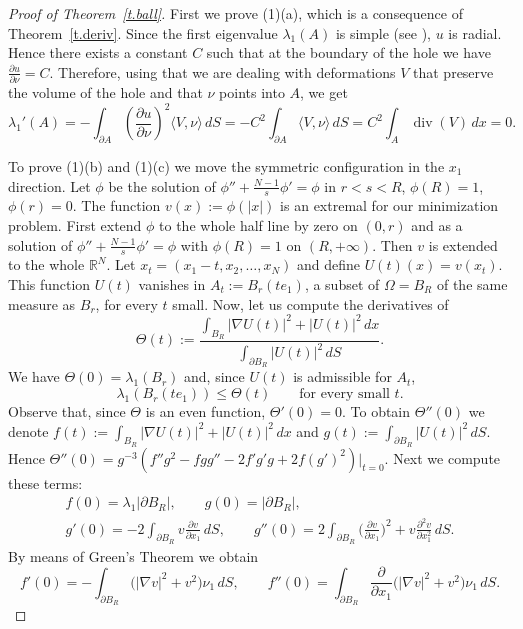 \documentclass[11pt]{amsart}
\theoremstyle{remark}
\numberwithin{equation}{section}
\newcommand{\R}{\mathbb{R}}
\DeclareMathOperator{\divg}{div}
\begin{document}
\begin{proof}[Proof of Theorem~\ref{t.ball}]
First we prove (1)(a), which is a consequence of Theorem~\ref{t.deriv}. Since the first eigenvalue $\lambda_1(A)$ is simple (see \cite{MR}), $u$ is radial. Hence there exists a constant $C$ such that at the boundary of the hole we have $\frac{\partial u}{\partial\nu}=C$. Therefore, using that we are dealing with deformations $V$ that preserve the volume of the hole and that $\nu$ points into $A$, we get
\[
\lambda_1'(A)=-\int_{\partial A}\left(\frac{\partial u}{\partial\nu}\right)^2\langle V,\nu\rangle\,dS=-C^2\int_{\partial A}\langle V,\nu\rangle\,dS=C^2\int_A\divg(V)\,dx=0.
\]

To prove (1)(b) and (1)(c) we move the symmetric configuration in the $x_1$ direction. Let $\phi$ be the solution of $\phi''+\frac{N-1}s\phi'=\phi$ in $r<s<R$, $\phi(R)=1$, $\phi(r)=0$. The function $v(x):=\phi(|x|)$ is an extremal for our minimization problem. First extend $\phi$ to the whole half line by zero on $(0,r)$ and as a solution of $\phi''+\frac{N-1}s\phi'=\phi$ with $\phi(R)=1$ on $(R,+\infty)$. Then $v$ is extended to the whole $\R^N$. Let $x_t=(x_1-t,x_2,\dots,x_N)$ and define $U(t)(x)=v(x_t)$. This function $U(t)$ vanishes in $A_t:=B_r(te_1)$, a subset of $\Omega=B_R$ of the same measure as $B_r$, for every $t$ small. Now, let us compute the derivatives of
\[
\Theta(t):=\frac{\int_{B_R}|\nabla U(t)|^2+|U(t)|^2\,dx}{\int_{\partial B_R}|U(t)|^2\,dS}.
\]
We have $\Theta(0)=\lambda_1(B_r)$ and, since $U(t)$ is admissible for $A_t$,
\begin{equation}\label{thetabound}
\lambda_1(B_r(te_1))\le\Theta(t)\qquad\text{for every small } t.
\end{equation}
Observe that, since $\Theta$ is an even function, $\Theta'(0)=0$. To obtain $\Theta''(0)$ we denote $f(t):=\int_{B_R}|\nabla U(t)|^2+|U(t)|^2\,dx$ and $g(t):=\int_{\partial B_R}|U(t)|^2\,dS$. Hence $\Theta''(0)=g^{-3}(f''g^2-fgg''-2f'g'g+2f(g')^2)|_{t=0}$. Next we compute these terms:
\begin{gather*}
f(0)=\lambda_1|\partial B_R|,\qquad g(0)=|\partial B_R|,\\
g'(0)=-2\int_{\partial B_R}v\frac{\partial v}{\partial x_1}\,dS,\qquad g''(0)=2\int_{\partial B_R}\Big(\frac{\partial v}{\partial x_1}\Big)^2+v\frac{\partial^2v}{\partial x_1^2}\,dS.
\end{gather*}
By means of Green's Theorem we obtain
\[
f'(0)=-\int_{\partial B_R}\big(|\nabla v|^2+v^2\big)\nu_1\,dS,\qquad f''(0)=\int_{\partial B_R}\frac{\partial}{\partial x_1}\big(|\nabla v|^2+v^2\big)\nu_1\,dS.
\]
\end{proof}
\end{document}

